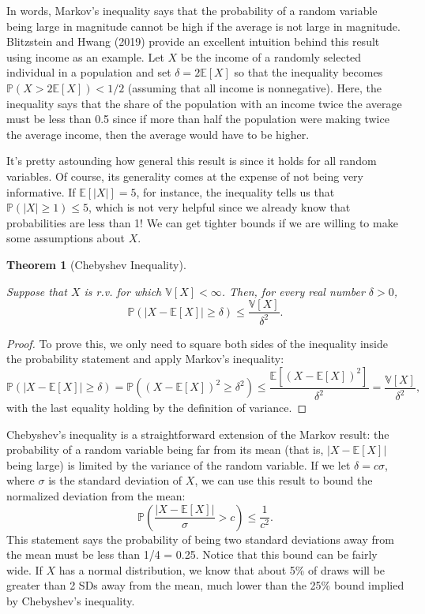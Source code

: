 \documentclass[
  letterpaper,
  DIV=11,
  numbers=noendperiod]{scrreprt}
\newcommand{\E}{\mathbb{E}}
\newcommand{\V}{\mathbb{V}}
\renewcommand{\P}{\mathbb{P}}
\theoremstyle{definition}
\theoremstyle{definition}
\theoremstyle{plain}
\newtheorem{theorem}{Theorem}[chapter]
\theoremstyle{remark}
\begin{document}
In words, Markov's inequality says that the probability of a random
variable being large in magnitude cannot be high if the average is not
large in magnitude. Blitzstein and Hwang (2019) provide an excellent
intuition behind this result using income as an example. Let \(X\) be
the income of a randomly selected individual in a population and set
\(\delta = 2\E[X]\) so that the inequality becomes
\(\P(X > 2\E[X]) < 1/2\) (assuming that all income is nonnegative).
Here, the inequality says that the share of the population with an
income twice the average must be less than 0.5 since if more than half
the population were making twice the average income, then the average
would have to be higher.

It's pretty astounding how general this result is since it holds for all
random variables. Of course, its generality comes at the expense of not
being very informative. If \(\E[|X|] = 5\), for instance, the inequality
tells us that \(\P(|X| \geq 1) \leq 5\), which is not very helpful since
we already know that probabilities are less than 1! We can get tighter
bounds if we are willing to make some assumptions about \(X\).

\begin{theorem}[Chebyshev
Inequality]\protect\hypertarget{thm-chebyshev}{}\label{thm-chebyshev}

Suppose that \(X\) is r.v. for which \(\V[X] < \infty\). Then, for every
real number \(\delta > 0\), \[
\P(|X-\E[X]| \geq \delta) \leq \frac{\V[X]}{\delta^2}.
\]

\end{theorem}

\begin{proof}

To prove this, we only need to square both sides of the inequality
inside the probability statement and apply Markov's inequality: \[
\P\left( |X - \E[X]| \geq \delta \right) = \P((X-\E[X])^2 \geq \delta^2) \leq \frac{\E[(X - \E[X])^2]}{\delta^2} = \frac{\V[X]}{\delta^2},
\] with the last equality holding by the definition of variance.

\end{proof}

Chebyshev's inequality is a straightforward extension of the Markov
result: the probability of a random variable being far from its mean
(that is, \(|X-\E[X]|\) being large) is limited by the variance of the
random variable. If we let \(\delta = c\sigma\), where \(\sigma\) is the
standard deviation of \(X\), we can use this result to bound the
normalized deviation from the mean: \[
\P\left(\frac{|X - \E[X]|}{\sigma} > c \right) \leq \frac{1}{c^2}.
\] This statement says the probability of being two standard deviations
away from the mean must be less than 1/4 = 0.25. Notice that this bound
can be fairly wide. If \(X\) has a normal distribution, we know that
about 5\% of draws will be greater than 2 SDs away from the mean, much
lower than the 25\% bound implied by Chebyshev's inequality.
\end{document}
